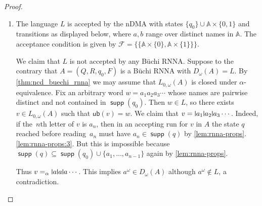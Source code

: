 \documentclass[final,a4paper,UKenglish,thm-restate,autoref,numberwithinsect]{lipics-v2021}
\newcommand{\midmid}{\hspace{0.2ex}{\rule[-0.1ex]{0.6pt}{1.65ex}}\hspace{0.2ex}}
\newcommand{\newletter}[1]{{\midmid}#1}
\newcommand{\F}{\mathcal{F}}
\newcommand{\ub}{\mathsf{ub}}
\numberwithin{equation}{section}
\newcommand{\seq}{\subseteq}
\newcommand{\+}[1]{\mathcal{#1}\xspace}
\newcommand{\names}{\mathbb{A}}
\DeclareMathOperator{\supp}{\mathsf{supp}} %
\theoremstyle{definition}
\begin{document}
\begin{proof}
\begin{enumerate}
  \item The language $L$ is accepted by the nDMA with states
    $\{q_0\} \cup \names\times \{0,1\}$ and transitions as displayed
    below, where $a,b$ range over distinct names in $\names$. The
    acceptance condition is given by
    $\F=\{\{\names\times \{0\}, \names\times \{1\}\}\}$.
    \begin{center}
    \end{center}
    We claim that $L$ is not accepted by any Büchi RNNA. Suppose to
    the contrary that $A=(Q,R,q_0,F)$ is a Büchi RNNA with
    $D_\omega(A)=L$. By \autoref{thm:ncd_buechi_rnna} we may assume
    that $L_{0,\omega}(A)$ is closed under $\alpha$-equivalence.
    Fix an arbitrary word $w=a_1a_2a_3\cdots$ whose names are pairwise
    distinct and not contained in $\supp(q_0)$. Then $w\in L$, so
    there exists $v\in L_{0,\omega}(A)$ such that $\ub(v)=w$. We claim
    that $v=\newletter a_1\newletter a_2\newletter a_3\cdots$. Indeed,
    if the~$n$th letter of $v$ is $a_n$, then in an accepting run for
    $v$ in $A$ the state $q$ reached before reading~$a_n$ must have
    $a_n\in \supp(q)$ by
    \autoref{lem:rnna-props}.\ref{lem:rnna-props:3}. But this is
    impossible because
    $\supp(q)\seq \supp(q_0)\cup \{a_1,\ldots, a_{n-1}\}$ again by
    \autoref{lem:rnna-props}.

    Thus $v=_\alpha \newletter a\newletter a\newletter a\cdots$. This
    implies $a^\omega\in D_\omega(A)$ although $a^\omega\not\in L$, a
    contradiction.\qedhere
  \end{enumerate}
\end{proof}
\end{document}
